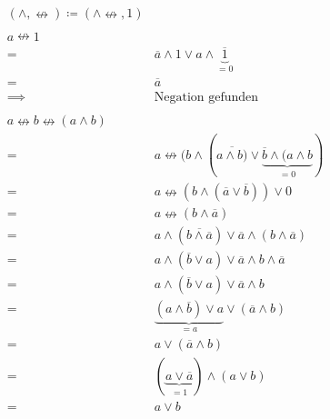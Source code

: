 \documentclass[a4paper]{scrartcl}
\begin{document}
				 \begin{align*}
				 	( \wedge , \nleftrightarrow ) \coloneqq (\wedge \nleftrightarrow , 1 )\\
				 	\\
				 	a \nleftrightarrow 1& \\
				 	=& \overline{a} \wedge 1 \vee a \wedge \underbrace{\overline{1}}_{=0} \\
				 	=& \overline{a}\\
				 	\implies & \text{Negation gefunden}\\
				 	\\
				 	a \nleftrightarrow b \nleftrightarrow ( a \wedge b ) &\\
				 	=& a \nleftrightarrow (b \wedge ( \overline{a \wedge b)} \vee \underbrace{\overline{b} \wedge ( a \wedge b}_{=0} )\\
				 	=& a \nleftrightarrow (b \wedge (\overline{a} \vee \overline{b})) \vee 0 \\
				 	=& a \nleftrightarrow (b \wedge \overline{a})\\
				 	=& a \wedge (\overline{b \wedge \overline{a}}) \vee \overline{a} \wedge ( b \wedge \overline{a} )\\
				 	=& a \wedge (\overline{b} \vee a) \vee \overline{a} \wedge  b \wedge \overline{a} \\
				 	=& a \wedge (\overline{b} \vee a) \vee \overline{a} \wedge  b  \\
				 	=& \underbrace{(a \wedge \overline{b} ) \vee a}_{=a} \vee (\overline{a} \wedge b)\\
				 	=& a \vee (\overline{a} \wedge b) \\
				 	=& (\underbrace{a \vee \overline{a}}_{=1}) \wedge ( a \vee b )\\
				 	=& a \vee b \\
				 \end{align*}
				 
\end{document}
